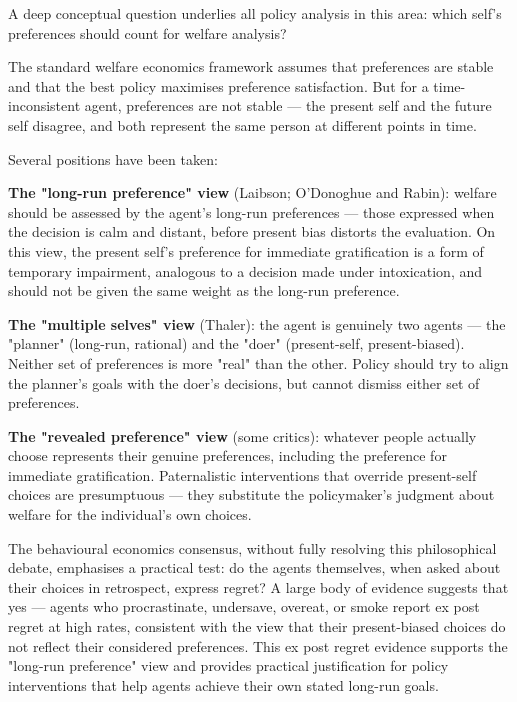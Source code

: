 \documentclass[12pt, letterpaper]{article}
\begin{document}
A deep conceptual question underlies all policy analysis in this area: which self's preferences should count for welfare analysis?

The standard welfare economics framework assumes that preferences are stable and that the best policy maximises preference satisfaction. But for a time-inconsistent agent, preferences are not stable --- the present self and the future self disagree, and both represent the same person at different points in time.

Several positions have been taken:

\textbf{The "long-run preference" view} (Laibson; O'Donoghue and Rabin): welfare should be assessed by the agent's long-run preferences --- those expressed when the decision is calm and distant, before present bias distorts the evaluation. On this view, the present self's preference for immediate gratification is a form of temporary impairment, analogous to a decision made under intoxication, and should not be given the same weight as the long-run preference.

\textbf{The "multiple selves" view} (Thaler): the agent is genuinely two agents --- the "planner" (long-run, rational) and the "doer" (present-self, present-biased). Neither set of preferences is more "real" than the other. Policy should try to align the planner's goals with the doer's decisions, but cannot dismiss either set of preferences.

\textbf{The "revealed preference" view} (some critics): whatever people actually choose represents their genuine preferences, including the preference for immediate gratification. Paternalistic interventions that override present-self choices are presumptuous --- they substitute the policymaker's judgment about welfare for the individual's own choices.

The behavioural economics consensus, without fully resolving this philosophical debate, emphasises a practical test: do the agents themselves, when asked about their choices in retrospect, express regret? A large body of evidence suggests that yes --- agents who procrastinate, undersave, overeat, or smoke report ex post regret at high rates, consistent with the view that their present-biased choices do not reflect their considered preferences. This ex post regret evidence supports the "long-run preference" view and provides practical justification for policy interventions that help agents achieve their own stated long-run goals.

\medskip
\end{document}
